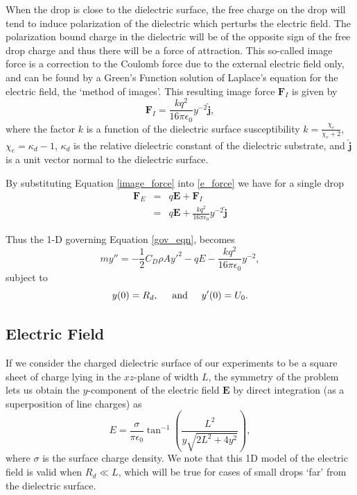\documentclass[aip,reprint, floatfix]{revtex4-1}
\begin{document}
When the drop is close to the dielectric surface, the free charge on the drop will tend to induce polarization of the dielectric which perturbs the electric field. The polarization bound charge in the dielectric will be of the opposite sign of the free drop charge and thus there will be a force of attraction. This so-called image force is a correction to the Coulomb force due to the external electric field only, and can be found by a Green's Function solution of Laplace's equation for the electric field, the `method of images'. \cite{david_j._griffiths_introduction_1999} This resulting image force $\mathbf{F}_I$ is given by
\begin{equation}
\mathbf{F}_I = \frac{k q^2}{16 \pi \epsilon_0} y^{-2} \hat{\mathbf{j}},
\label{image_force}
\end{equation}
where the factor $k$ is a function of the dielectric surface susceptibility $k = \frac{\chi_e}{\chi_e + 2}$, $\chi_e = \kappa_d - 1$, $\kappa_d$ is the relative dielectric constant of the dielectric substrate, and $\hat{\mathbf{j}}$ is a unit vector normal to the dielectric surface.

By substituting Equation \ref{image_force} into \ref{e_force} we have for a single drop
\begin{eqnarray}
 \mathbf{F}_E &=& q \mathbf{E} + \mathbf{F}_I \nonumber \\
 &=& q \mathbf{E} + \frac{k q^2}{16 \pi \epsilon_0 } y^{-2} \hat{\mathbf{j}} \label{e_forces}
\end{eqnarray}

Thus the 1-D governing Equation \ref{gov_eqn}, becomes
\begin{equation}
 \label{gov_eqn_subs}
m y'' = - \frac{1}{2} C_D \rho A {y'}^2 - q E - \frac{k q^2}{16 \pi \epsilon_0} y^{-2},
\end{equation}
subject to
\begin{equation*}
y(0) = R_d, \hspace{5 mm} \mbox{and} \hspace{5 mm} y'(0) = U_0 .
\end{equation*}

\subsection{Electric Field}
If we consider the charged dielectric surface of our experiments to be a square sheet of charge lying in the $xz$-plane of width $L$, the symmetry of the problem lets us obtain the $y$-component of the electric field $\mathbf{E}$ by direct integration (as a superposition of line charges) \citep{david_j._griffiths_introduction_1999} as
\begin{equation}
\label{e_field}
E = \frac{\sigma}{ \pi \epsilon_0} \tan^{-1} \left( \frac{L^2}{y \sqrt{2L^2 + 4y^2}}\right)
,\end{equation}
where $\sigma$ is the surface charge density. We note that this 1D model of the electric field is valid when $R_d \ll L$, which will be true for cases of small drops `far' from the dielectric surface. 
\end{document}
